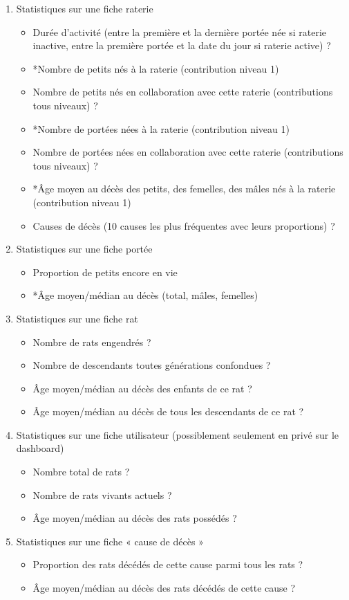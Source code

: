\documentclass[a4paper,10pt]{article}
\begin{document}
\begin{enumerate}
\item Statistiques sur une fiche raterie
\begin{itemize}
\item Durée d'activité (entre la première et la dernière portée née si raterie inactive, entre la première portée et la date du jour si raterie active) ?
\item *Nombre de petits nés à la raterie (contribution niveau 1)
\item Nombre de petits nés en collaboration avec cette raterie (contributions tous niveaux) ?
\item *Nombre de portées nées à la raterie (contribution niveau 1)
\item Nombre de portées nées en collaboration avec cette raterie (contributions tous niveaux) ?
\item *Âge moyen au décès des petits, des femelles, des mâles nés à la raterie (contribution niveau 1)
\item Causes de décès (10 causes les plus fréquentes avec leurs proportions) ?
\end{itemize}
\item Statistiques sur une fiche portée
\begin{itemize}
\item Proportion de petits encore en vie
\item *Âge moyen/médian au décès (total, mâles, femelles)
\end{itemize}
\item Statistiques sur une fiche rat
\begin{itemize}
\item Nombre de rats engendrés ?
\item Nombre de descendants toutes générations confondues ?
\item Âge moyen/médian au décès des enfants de ce rat ?
\item Âge moyen/médian au décès de tous les descendants de ce rat ?
\end{itemize}
\item Statistiques sur une fiche utilisateur (possiblement seulement en privé sur le dashboard)
\begin{itemize}
\item Nombre total de rats ?
\item Nombre de rats vivants actuels ?
\item Âge moyen/médian au décès des rats possédés ?
\end{itemize}
\item Statistiques sur une fiche « cause de décès »
\begin{itemize}
\item Proportion des rats décédés de cette cause parmi tous les rats ?
\item Âge moyen/médian au décès des rats décédés de cette cause ? 
\end{itemize} 
\end{enumerate}
\end{document}
